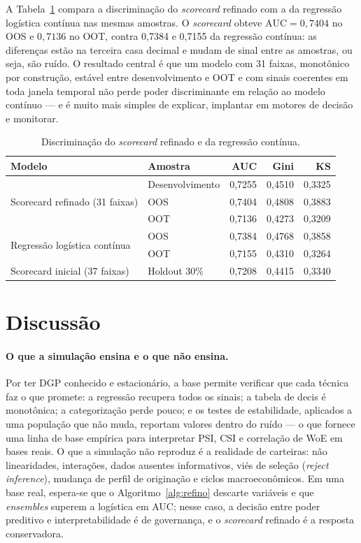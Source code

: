 \documentclass[11pt,a4paper]{article}
\newcommand{\auc}{\mathrm{AUC}}
\begin{document}
A Tabela~\ref{tab:final} compara a discriminação do \emph{scorecard} refinado com a da regressão logística contínua nas mesmas amostras. O \emph{scorecard} obteve $\auc=0{,}7404$ no OOS e $0{,}7136$ no OOT, contra 0{,}7384 e 0{,}7155 da regressão contínua: as diferenças estão na terceira casa decimal e mudam de sinal entre as amostras, ou seja, são ruído. O resultado central é que um modelo com 31 faixas, monotônico por construção, estável entre desenvolvimento e OOT e com sinais coerentes em toda janela temporal não perde poder discriminante em relação ao modelo contínuo --- e é muito mais simples de explicar, implantar em motores de decisão e monitorar.

\begin{table}[H]
\centering\small
\caption{Discriminação do \emph{scorecard} refinado e da regressão contínua.}
\label{tab:final}
\begin{tabular}{llrrr}
\toprule
Modelo & Amostra & AUC & Gini & KS \\
\midrule
\multirow{3}{*}{Scorecard refinado (31 faixas)} & Desenvolvimento & 0,7255 & 0,4510 & 0,3325 \\
 & OOS & 0,7404 & 0,4808 & 0,3883 \\
 & OOT & 0,7136 & 0,4273 & 0,3209 \\
\midrule
\multirow{2}{*}{Regressão logística contínua} & OOS & 0,7384 & 0,4768 & 0,3858 \\
 & OOT & 0,7155 & 0,4310 & 0,3264 \\
\midrule
Scorecard inicial (37 faixas) & Holdout 30\% & 0,7208 & 0,4415 & 0,3340 \\
\bottomrule
\end{tabular}
\end{table}

\section{Discussão}
\label{sec:discussao}

\paragraph{O que a simulação ensina e o que não ensina.} Por ter DGP conhecido e estacionário, a base permite verificar que cada técnica faz o que promete: a regressão recupera todos os sinais; a tabela de decis é monotônica; a categorização perde pouco; e os testes de estabilidade, aplicados a uma população que não muda, reportam valores dentro do ruído --- o que fornece uma linha de base empírica para interpretar PSI, CSI e correlação de WoE em bases reais. O que a simulação não reproduz é a realidade de carteiras: não linearidades, interações, dados ausentes informativos, viés de seleção (\emph{reject inference}), mudança de perfil de originação e ciclos macroeconômicos. Em uma base real, espera-se que o Algoritmo~\ref{alg:refino} descarte variáveis e que \emph{ensembles} superem a logística em AUC; nesse caso, a decisão entre poder preditivo e interpretabilidade é de governança, e o \emph{scorecard} refinado é a resposta conservadora.
\end{document}
